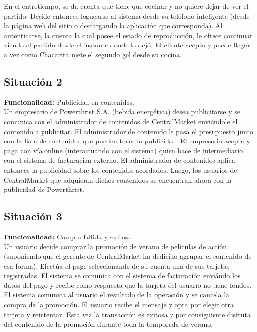 \documentclass[11pt, a4paper, spanish]{article}
\begin{document}
        En el entretiempo, se da cuenta que tiene que cocinar y no quiere dejar de ver el partido. Decide entonces loguearse al sistema desde su 
    tel\'efono inteligente (desde la p\'agina web del sitio o descargando la aplicaci\'on que corresponda). 
    Al autenticarse, la cuenta la cual posee el estado de reproducci\'on, le ofrece continuar viendo el partido desde el instante donde lo dej\'o.
    El cliente acepta y puede llegar a ver como Chacarita mete el segundo gol desde su cocina.

\subsection{Situaci\'on 2}

	\textbf{Funcionalidad:} Publicidad en contenidos.\\

        Un empresario de Powerthrist S.A. (bebida energ\'etica) desea publicitarse y se comunica con el administrador de contenidos de CentralMarket 
    envi\'andole el contenido a publicitar.
    El administrador de contenido le pasa el presupuesto junto con la lista de contenidos que pueden tener la publicidad.
    El empresario acepta y paga con v\'ia online (interactuando con el sistema) quien hace de intermediario con el sistema de facturaci\'on externo.
    El administrador de contenidos aplica entonces la publicidad sobre los contenidos acordados.
    Luego, los usuarios de CentralMarket que adquieran dichos contenidos se encuentran ahora con la publicidad de Powerthrist.

\subsection{Situaci\'on 3}

	\textbf{Funcionalidad:} Compra fallida y exitosa.\\

        Un usuario decide comprar la promoci\'on de verano de pel\'iculas de acci\'on (suponiendo que el gerente de CentralMarket ha dedicido agrupar el     
    contenido de esa forma). Efect\'ua el pago seleccionando de su cuenta una de sus tarjetas registradas. El sistema se comunica con el sistema de 
    facturaci\'on envi\'ando los datos del pago y recibe como respuesta que la tarjeta del usuario no tiene fondos. El sistema comunica al usuario el 
    resultado de la operaci\'on y se cancela la compra de la promoci\'on. El usuario recibe el mensaje y opta por elegir otra tarjeta y reintentar. Esta 
    vez la transacci\'on es exitosa y por consiguiente disfruta del contenido de la promoci\'on durante toda la temporada de verano.
\end{document}
